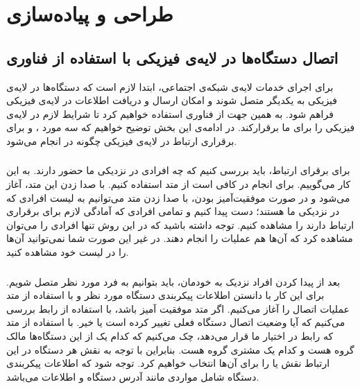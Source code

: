\chapter{طراحی و پیاده‌سازی}
\thispagestyle{empty}
\section{اتصال دستگاه‌ها  در لایه‌ی فیزیکی با استفاده از فناوری }

برای اجرای خدمات لایه‌ی شبکه‌ی اجتماعی، ابتدا لازم است که دستگاه‌ها در لایه‌ی فیزیکی به یکدیگر متصل شوند و امکان ارسال و دریافت اطلاعات در لایه‌ی فیزیکی فراهم شود. به همین جهت از فناوری 
استفاده خواهیم کرد تا شرایط لازم در لایه‌ی فیزیکی را برای ما برقرار‌کند. در ادامه‌ی این بخش توضیح خواهیم که سه مورد 
،
و
برای برقراری ارتباط در لایه‌ی فیزیکی چگونه در
 انجام می‌شود.
\subsection{}
 برای برقرای ارتباط، باید بررسی کنیم که چه افرادی در نزدیکی ما حضور دارند. به این کار
  می‌گوییم. برای انجام 
در 
کافی است از متد
استفاده کنیم. با صدا زدن این متد،
آغاز می‌شود و در صورت موفقیت‌آمیز بودن، با صدا زدن متد
می‌توانیم به لیست افرادی که در نزدیکی ما هستند؛ دست پیدا کنیم و تمامی افرادی که آمادگی لازم برای برقراری ارتباط دارند را مشاهده کنیم. توجه داشته باشید که در این روش تنها افرادی را می‌توان مشاهده کرد که آن‌ها هم عملیات 
را انجام دهند. در غیر این صورت شما نمی‌توانید آن‌ها را در لیست خود مشاهده کنید.
\cite{wifidevelopers}

\subsection{}
بعد از پیدا کردن افراد نزدیک به خودمان، باید بتوانیم به فرد مورد نظر متصل شویم. برای این کار با دانستن اطلاعات پیکربندی دستگاه مورد نظر و با استفاده از متد 
عملیات اتصال را آغاز می‌کنیم. اگر متد 
موفقیت آمیز باشد، با استفاده از رابط 
بررسی می‌کنیم که آیا وضعیت اتصال دستگاه فعلی تغییر کرده است یا خیر. با استفاده از متد 
که رابط 
 در اختیار ما قرار می‌دهد، چک می‌کنیم که کدام یک از این دستگاه‌ها مالک گروه هست و کدام یک مشتری گروه هست. بنابراین با توجه به نقش هر دستگاه در این ارتباط نقش  
یا 
را برای آن‌ها انتخاب خواهیم کرد.
توجه شود که اطلاعات پیکربندی دستگاه شامل مواردی مانند آدرس 
دستگاه و اطلاعات 
می‌باشد.
\cite{wifidevelopers}

